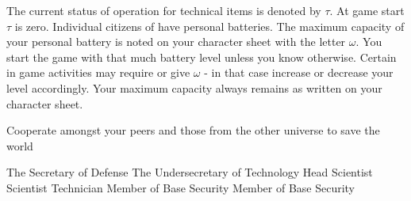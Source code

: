 \documentclass[blue]{guildcamp3}
\begin{document}
The current status of operation for technical items is denoted by $\tau$. At game start $\tau$ is zero. Individual citizens of \bTechWorld{} have personal batteries. The maximum capacity of your personal battery is noted on your character sheet with the letter $\omega$. You start the game with that much battery level unless you know otherwise. Certain in game activities may require or give $\omega$ - in that case increase or decrease your level accordingly. Your maximum capacity always remains as written on your character sheet. 

\begin{itemz}[Goals]
	\item Cooperate amongst your peers and those from the other universe to save the world
\end{itemz}


\begin{members}
	\member{\cPoliOne{}} The Secretary of Defense
	\member{\cPoliTwo{}} The Undersecretary of Technology
	\member{\cSciOne{}} Head Scientist
	\member{\cSciTwo{}} Scientist
	\member{\cTech{}} Technician
	\member{\cSpecOpOne{}} Member of Base Security
	\member{\cSpecOpTwo{}} Member of Base Security
\end{members}
\end{document}
